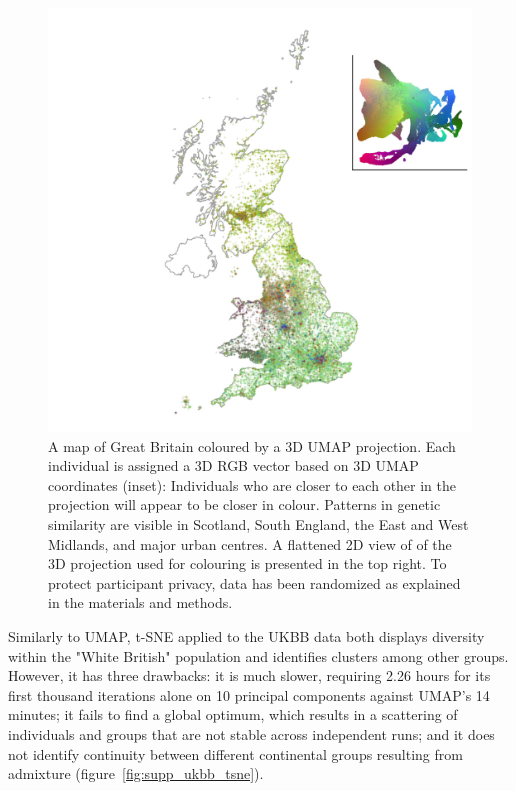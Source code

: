 \documentclass[12pt]{pnas-new}
\begin{document}
\begin{figure}
    \centering
    \includegraphics[width=0.5\columnwidth]{images/UKBB_mapsInMaps_2D3_permute50.jpg}
    \caption{A map of Great Britain coloured by a 3D UMAP projection. Each individual is assigned a 3D RGB vector based on 3D UMAP coordinates (inset): Individuals who are closer to each other in the projection will appear to be closer in colour. Patterns in genetic similarity are visible in Scotland, South England, the East and West Midlands, and major urban centres. A flattened 2D view of of the 3D projection used for colouring is presented in the top right. To protect participant privacy, data has been randomized as explained in the materials and methods.}
    \label{fig:umap_ukbb_geo_map}
\end{figure}

Similarly to UMAP, t-SNE applied to the UKBB data both displays diversity within the "White British" population and identifies clusters among other groups. However, it has three drawbacks: it is much slower, requiring 2.26 hours for its first thousand iterations alone on 10 principal components against UMAP's 14 minutes; it fails to find a global optimum, which results in a scattering of individuals and groups that are not stable across independent runs; and it does not identify continuity between different continental groups resulting from admixture (figure~\ref{fig:supp_ukbb_tsne}).     
\end{document}
